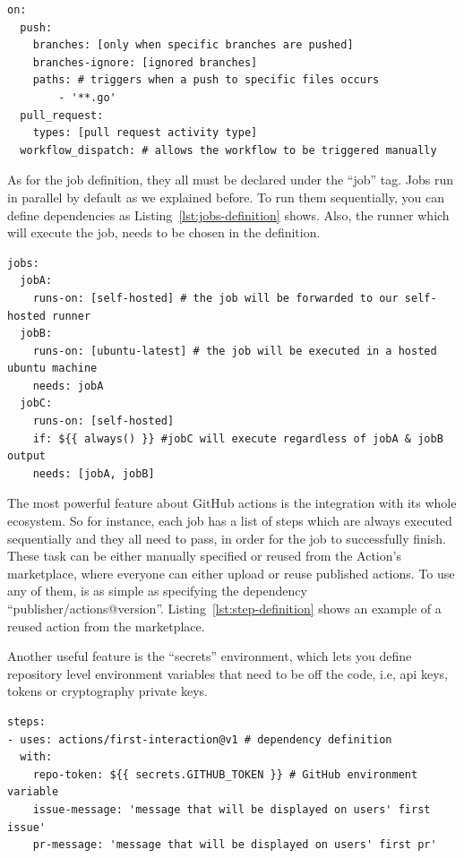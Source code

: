\begin{lstlisting}[caption=Common Workflow Triggers,label={lst:trigger-options}]
on:
  push:
    branches: [only when specific branches are pushed]
    branches-ignore: [ignored branches]
    paths: # triggers when a push to specific files occurs
        - '**.go'
  pull_request:
    types: [pull request activity type]
  workflow_dispatch: # allows the workflow to be triggered manually
\end{lstlisting}

As for the job definition, they all must be declared under the \enquote{job} tag. Jobs run in parallel by default as we explained before. To run them sequentially, you can define dependencies as Listing~\ref{lst:jobs-definition} shows. Also, the runner which will execute the job, needs to be chosen in the definition.

\begin{lstlisting}[caption=Job Dependencies Definition,label={lst:jobs-definition}]
jobs:
  jobA:
    runs-on: [self-hosted] # the job will be forwarded to our self-hosted runner
  jobB:
    runs-on: [ubuntu-latest] # the job will be executed in a hosted ubuntu machine
    needs: jobA
  jobC:
    runs-on: [self-hosted]
    if: ${{ always() }} #jobC will execute regardless of jobA & jobB output
    needs: [jobA, jobB]
\end{lstlisting}

The most powerful feature about GitHub actions is the integration with its whole ecosystem. So for instance, each job has a list of steps which are always executed sequentially and they all need to pass, in order for the job to successfully finish. These task can be either manually specified or reused from the Action's marketplace, where everyone can either upload or reuse published actions. To use any of them, is as simple as specifying the dependency \enquote{publisher/actions@version}. Listing~\ref{lst:step-definition} shows an example of a reused action from the marketplace.

Another useful feature is the \enquote{secrets} environment, which lets you define repository level environment variables that need to be off the code, i.e, \gls{api} keys, tokens or cryptography private keys.

\begin{lstlisting}[caption=Steps Definition,label={lst:step-definition}]
steps:
- uses: actions/first-interaction@v1 # dependency definition
  with:
    repo-token: ${{ secrets.GITHUB_TOKEN }} # GitHub environment variable
    issue-message: 'message that will be displayed on users' first issue'
    pr-message: 'message that will be displayed on users' first pr'
\end{lstlisting}